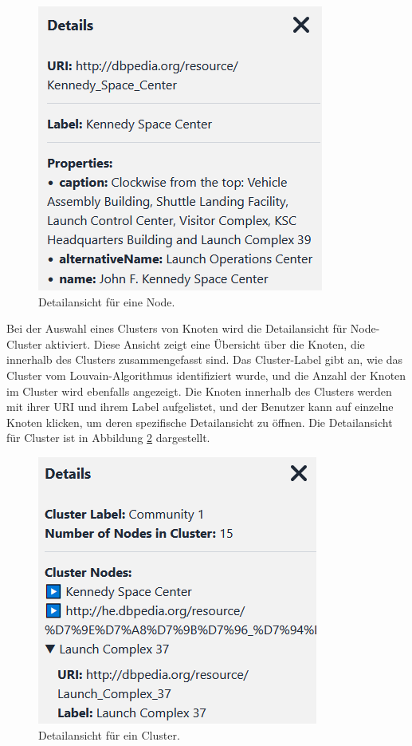 \begin{figure}[h]
    \centering
    \includegraphics[height=.5\textwidth]{images/03/NodeDetails.png}
    \caption{Detailansicht für eine Node.}
    \label{fig:realization:implementation:NodeDetails}
\end{figure}

Bei der Auswahl eines Clusters von Knoten wird die Detailansicht für Node-Cluster aktiviert. Diese Ansicht zeigt eine Übersicht über die Knoten, die innerhalb des Clusters zusammengefasst sind. Das Cluster-Label gibt an, wie das Cluster vom Louvain-Algorithmus identifiziert wurde, und die Anzahl der Knoten im Cluster wird ebenfalls angezeigt. Die Knoten innerhalb des Clusters werden mit ihrer URI und ihrem Label aufgelistet, und der Benutzer kann auf einzelne Knoten klicken, um deren spezifische Detailansicht zu öffnen. Die Detailansicht für Cluster ist in Abbildung \ref{fig:realization:implementation:ClusterDetails} dargestellt.

\begin{figure}[h]
    \centering
    \includegraphics[height=.5\textwidth]{images/03/ClusterDetails.png}
    \caption{Detailansicht für ein Cluster.}
    \label{fig:realization:implementation:ClusterDetails}
\end{figure}

